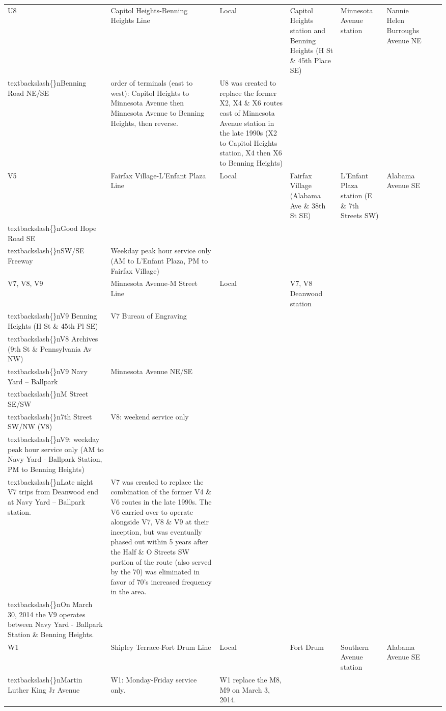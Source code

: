 \documentclass{article}
\begin{document}
\begin{tabular}{llllllll}
U8 & Capitol Heights-Benning Heights Line & Local & Capitol Heights station and Benning Heights (H St \& 45th Place SE) & Minnesota Avenue station & Nannie Helen Burroughs Avenue NE\\textbackslash\{\}nBenning Road NE/SE & order of terminals (east to west): Capitol Heights to Minnesota Avenue then Minnesota Avenue to Benning Heights, then reverse. & U8 was created to replace the former X2, X4 \& X6 routes east of Minnesota Avenue station in the late 1990s (X2 to Capitol Heights station, X4 then X6 to Benning Heights) \\
V5 & Fairfax Village-L'Enfant Plaza Line & Local & Fairfax Village (Alabama Ave \& 38th St SE) & L'Enfant Plaza station (E \& 7th Streets SW) & Alabama Avenue SE\\textbackslash\{\}nGood Hope Road SE\\textbackslash\{\}nSW/SE Freeway & Weekday peak hour service only (AM to L'Enfant Plaza, PM to Fairfax Village) &  \\
V7, V8, V9 & Minnesota Avenue-M Street Line & Local & V7, V8 Deanwood station\\textbackslash\{\}nV9 Benning Heights (H St \& 45th Pl SE) & V7 Bureau of Engraving\\textbackslash\{\}nV8 Archives (9th St \& Pennsylvania Av NW)\\textbackslash\{\}nV9 Navy Yard – Ballpark & Minnesota Avenue NE/SE\\textbackslash\{\}nM Street SE/SW\\textbackslash\{\}n7th Street SW/NW (V8) & V8: weekend service only\\textbackslash\{\}nV9: weekday peak hour service only (AM to Navy Yard - Ballpark Station, PM to Benning Heights)\\textbackslash\{\}nLate night V7 trips from Deanwood end at Navy Yard – Ballpark station. & V7 was created to replace the combination of the former V4 \& V6 routes in the late 1990s. The V6 carried over to operate alongside V7, V8 \& V9 at their inception, but was eventually phased out within 5 years after the Half \& O Streets SW portion of the route (also served by the 70) was eliminated in favor of 70's increased frequency in the area.\\textbackslash\{\}nOn March 30, 2014 the V9 operates between Navy Yard - Ballpark Station \& Benning Heights. \\
W1 & Shipley Terrace-Fort Drum Line & Local & Fort Drum & Southern Avenue station & Alabama Avenue SE\\textbackslash\{\}nMartin Luther King Jr Avenue & W1: Monday-Friday service only. & W1 replace the M8, M9 on March 3, 2014. \\

\end{tabular}
\end{document}
